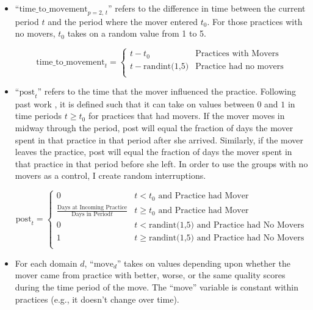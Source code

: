 \documentclass[11pt]{article}
\begin{document}
\begin{itemize}

\item ``$\textrm{time\_to\_movement}_{p=2\textrm{, }t}$'' refers to the difference in time between the current period $t$ and the period where the mover entered $t_0$. For those practices with no movers, $t_0$ takes on a random value from 1 to 5.

$$
  \textrm{time\_to\_movement}_{t} = \begin{cases}
  t - t_0 & \textrm{Practices with Movers} \\
  t - \textrm{randint(1,5)} & \textrm{Practice had no movers} \\
  \end{cases}
$$



\item ``$\textrm{post}_{t}$'' refers to the time that the mover influenced the practice. Following past work \citep{shover2019association}, it is defined such that it can take on values between $0$ and $1$ in time periods $t \geq t_0$ for practices that had movers. If the mover moves in midway through the period, post will equal the fraction of days the mover spent in that practice in that period after she arrived. Similarly, if the mover leaves the practice, post will equal the fraction of days the mover spent in that practice in that period before she left. In order to use the groups with no movers as a control, I create random interruptions.

$$
  \textrm{post}_{t} = \begin{cases}
  0 & t < t_0 \textrm{ and Practice had Mover} \\
  \frac{\textrm{Days at Incoming Practice}}{\textrm{Days in Period} t} & t \geq t_0 \textrm{ and Practice had Mover}\\
  0 & t < \textrm{randint(1,5) and } \textrm{Practice had No Movers} \\
  1 & t \geq \textrm{randint(1,5) and } \textrm{Practice had No Movers} \\
  \end{cases}
$$


\item For each domain $d$, ``$\textrm{move}_{d}$'' takes on values depending upon whether the mover came from practice with better, worse, or the same quality scores during the time period of the move. The ``move'' variable is constant within practices (e.g., it doesn't change over time).


\end{itemize}
\end{document}
